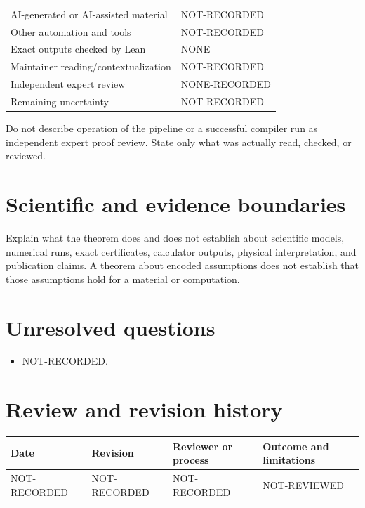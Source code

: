 \documentclass[11pt]{article}
\begin{document}
\begin{tabularx}{\textwidth}{@{}lX@{}}
\toprule
AI-generated or AI-assisted material & NOT-RECORDED \\
Other automation and tools & NOT-RECORDED \\
Exact outputs checked by Lean & NONE \\
Maintainer reading/contextualization & NOT-RECORDED \\
Independent expert review & NONE-RECORDED \\
Remaining uncertainty & NOT-RECORDED \\
\bottomrule
\end{tabularx}

Do not describe operation of the pipeline or a successful compiler run as independent
expert proof review. State only what was actually read, checked, or reviewed.

\section{Scientific and evidence boundaries}

Explain what the theorem does and does not establish about scientific models, numerical
runs, exact certificates, calculator outputs, physical interpretation, and publication
claims. A theorem about encoded assumptions does not establish that those assumptions
hold for a material or computation.

\section{Unresolved questions}

\begin{itemize}
  \item NOT-RECORDED.
\end{itemize}

\section{Review and revision history}

\begin{tabularx}{\textwidth}{@{}lllX@{}}
\toprule
Date & Revision & Reviewer or process & Outcome and limitations \\
\midrule
NOT-RECORDED & NOT-RECORDED & NOT-RECORDED & NOT-REVIEWED \\
\bottomrule
\end{tabularx}
\end{document}
